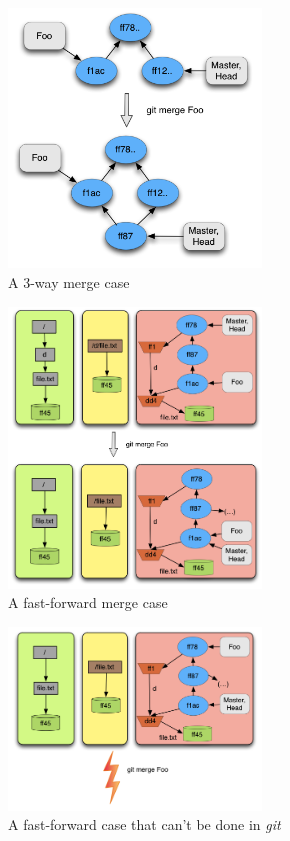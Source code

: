 \begin{figure}[!t]
   \centering
   \includegraphics[width=0.6\textwidth]{images/3merge.png}
   \caption{A 3-way merge case}\label{fig:3mergecase}
\end{figure}

\begin{figure}[!t]
   \centering
   \includegraphics[width=0.6\textwidth]{images/fast_forward_merge1.png}
   \caption{A fast-forward merge case}\label{fig:ffmerge1}
\end{figure}

\begin{figure}[!t]
   \centering
   \includegraphics[width=0.6\textwidth]{images/fast_forward_merge_pre.png}
   \caption{A fast-forward case that can't be done in
   \emph{git}}\label{fig:ffmergepre}
\end{figure}

